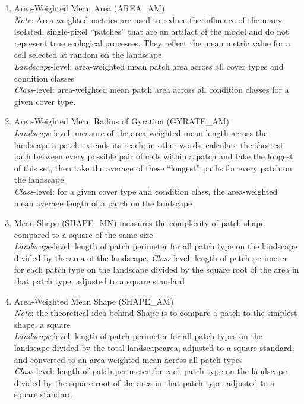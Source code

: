 \begin{enumerate}
	\item Area-Weighted Mean Area (AREA\_AM)\\
	\emph{Note}: Area-weighted metrics are used to reduce the influence of the many isolated, single-pixel ``patches'' that are an artifact of the model and do not represent true ecological processes. They reflect the mean metric value for a cell selected at random on the landscape. 	\\
	\emph{Landscape}-level: area-weighted mean patch area across all cover types and condition classes \\
	\emph{Class}-level: area-weighted mean patch area across all condition classes for a given cover type. \\
	
	\item Area-Weighted Mean Radius of Gyration (GYRATE\_AM)\\
	\emph{Landscape}-level: measure of the area-weighted mean length across the landscape a patch extends its reach; in other words, calculate the shortest path between every possible pair of cells within a patch and take the longest of this set, then take the average of these ``longest'' paths for every patch on the landscape\\
	\emph{Class}-level: for a given cover type and condition class, the area-weighted mean average length of a patch on the landscape\\
	
	\item Mean Shape (SHAPE\_MN) measures the complexity of patch shape compared to a square of the same size\\
	\emph{Landscape}-level: length of patch perimeter for all patch type on the landscape divided by the area of the landscape, %
	\emph{Class}-level: length of patch perimeter for each patch type on the landscape divided by the square root of the area in that patch type, adjusted to a square standard \\
	
	\item Area-Weighted Mean Shape (SHAPE\_AM)\\
	\emph{Note}: the theoretical idea behind Shape is to compare a patch to the simplest shape, a square 		\\
	\emph{Landscape}-level: length of patch perimeter for all patch types on the landscape divided by the total landscapearea, adjusted to a square standard, and converted to an area-weighted mean across all patch types \\
	\emph{Class}-level: length of patch perimeter for each patch type on the landscape divided by the square root of the area in that patch type, adjusted to a square standard\\
	

\end{enumerate}
